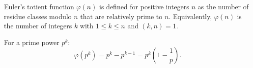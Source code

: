 Euler's totient function $\varphi(n)$ is defined for positive integers $n$ as the number of residue classes modulo $n$ that are relatively prime to $n$. Equivalently, $\varphi(n)$ is the number of integers $k$ with $1 \leq k \leq n$ and $(k, n) = 1$.

For a prime power $p^k$:
$$\varphi(p^k) = p^k - p^{k-1} = p^k \left(1 - \frac{1}{p}\right).$$
